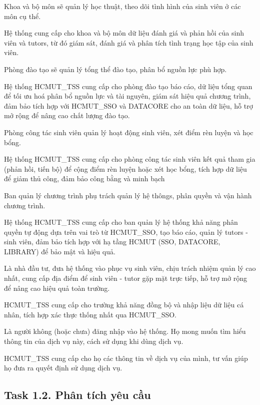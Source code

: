 Khoa và bộ môn sẽ quản lý học thuật, theo dõi tình hình của sinh viên ở các môn cụ thể.

Hệ thống cung cấp cho khoa và bộ môn dữ liệu đánh giá và phản hồi của sinh viên và tutors, từ đó giám sát, đánh giá và phân tích tình trạng học tập của sinh viên.

Phòng đào tạo sẽ quản lý tổng thể đào tạo, phân bổ nguồn lực phù hợp.

Hệ thống HCMUT\_TSS cung cấp cho phòng đào tạo báo cáo, dữ liệu tổng quan để tối ưu hoá phân bổ nguồn lực và tài nguyên, giám sát hiệu quả chương trình, đảm bảo tích hợp với HCMUT\_SSO và DATACORE cho an toàn dữ liệu, hỗ trợ mở rộng để nâng cao chất lượng đào tạo.

Phòng công tác sinh viên quản lý hoạt động sinh viên, xét điểm rèn luyện và học bổng.

Hệ thống HCMUT\_TSS cung cấp cho phòng công tác sinh viên kết quả tham gia (phản hồi, tiến bộ) để cộng điểm rèn luyện hoặc xét học bổng, tích hợp dữ liệu để giảm thủ công, đảm bảo công bằng và minh bạch

Ban quản lý chương trình phụ trách quản lý hệ thôngs, phân quyền và vận hành chương trình.

Hệ thống HCMUT\_TSS cung cấp cho ban quản lý hệ thống khả năng phân quyền tự động dựa trên vai trò từ HCMUT\_SSO, tạo báo cáo, quản lý tutors - sinh viên, đảm bảo tích hợp với hạ tầng HCMUT (SSO, DATACORE, LIBRARY) để bảo mật và hiệu quả.

Là nhà đầu tư, đưa hệ thống vào phục vụ sinh viên, chịu trách nhiệm quản lý cao nhất, cung cấp địa điểm để sinh viên - tutor gặp mặt trực tiếp, hỗ trợ mở rộng để nâng cao hiệu quả toàn trường.

HCMUT\_TSS cung cấp cho trường khả năng đồng bộ và nhập liệu dữ liệu cá nhân, tích hợp xác thực thống nhất qua HCMUT\_SSO.

Là người không (hoặc chưa) đăng nhập vào hệ thống. Họ mong muốn tìm hiểu thông tin của dịch vụ này,
cách sử dụng khi dùng dịch vụ.

HCMUT\_TSS cung cấp cho họ các thông tin về dịch vụ của mình, tư vấn giúp họ đưa ra quyết định
sử dụng dịch vụ.

\subsection{Task 1.2. Phân tích yêu cầu}

